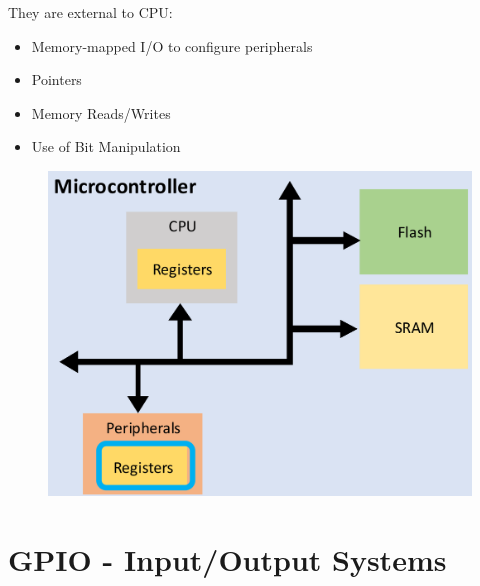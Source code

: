 They are external to CPU:

\begin{minipage}{\linewidth}
      \centering
      \begin{minipage}{0.40\linewidth}
            \begin{itemize}
                \item Memory-mapped I/O to configure peripherals
                \item Pointers
                \item Memory Reads/Writes
                \item Use of Bit Manipulation
            \end{itemize}
      \end{minipage}
      \hspace{0.05\linewidth}
      \begin{minipage}{0.35\linewidth}
            \begin{figure}[H]
                \centering
                \includegraphics[width=1\linewidth]{img/image55.png}
            \end{figure}
      \end{minipage}
  \end{minipage}








\section{GPIO - Input/Output Systems}

